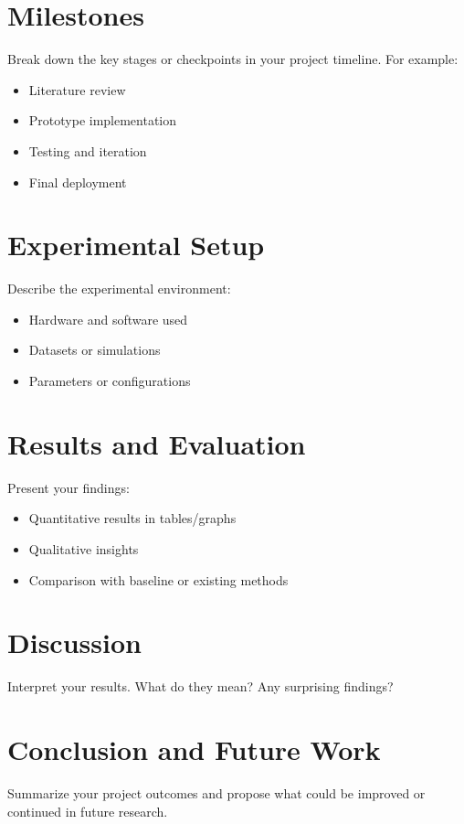 \documentclass[conference]{IEEEtran}
\begin{document}
\section{Milestones}
Break down the key stages or checkpoints in your project timeline. For example:
\begin{itemize}
    \item Literature review
    \item Prototype implementation
    \item Testing and iteration
    \item Final deployment
\end{itemize}

\section{Experimental Setup}
Describe the experimental environment:
\begin{itemize}
    \item Hardware and software used
    \item Datasets or simulations
    \item Parameters or configurations
\end{itemize}

\section{Results and Evaluation}
Present your findings:
\begin{itemize}
    \item Quantitative results in tables/graphs
    \item Qualitative insights
    \item Comparison with baseline or existing methods
\end{itemize}

\begin{figure}[!ht]
    \centering
\end{figure}

\section{Discussion}
Interpret your results. What do they mean? Any surprising findings?

\section{Conclusion and Future Work}
Summarize your project outcomes and propose what could be improved or continued in future research.
\end{document}
